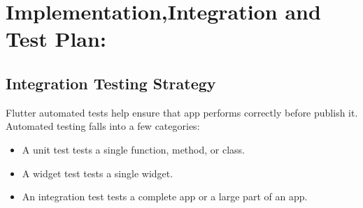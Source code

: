 \documentclass [12pt]{article}
\begin{document}
\section{Implementation,Integration and Test Plan:}


\subsection{Integration Testing Strategy}
Flutter automated tests help ensure that app performs correctly before publish it.
Automated testing falls into a few categories:
\begin{itemize}[•]
\item A unit test tests a single function, method, or class.
\item A widget test tests a single widget.
\item An integration test tests a complete app or a large part of an app.
\end{itemize}
\end{document}
